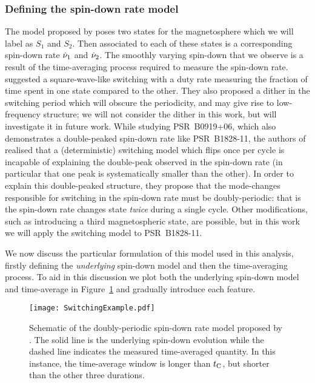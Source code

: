 \documentclass[../full_thesis/full_thesis.tex]{subfiles}
\begin{document}
\subsubsection{Defining the spin-down rate model}
\label{sec: spin-down rate}

The model proposed by \citet{Lyne2010} poses two states for the magnetosphere
which we will label as $S_{1}$ and $S_{2}$. Then associated to each of these
states is a corresponding spin-down rate $\dot{\nu}_{1}$ and $\dot{\nu}_{2}$. The
smoothly varying spin-down that we observe is a result of the time-averaging
process required to measure the spin-down rate. \citet{Lyne2010} suggested a
square-wave-like switching with a duty rate measuring the fraction of time
spent in one state compared to the other. They also proposed a dither in the
switching period which will obscure the periodicity, and may give rise to
low-frequency structure; we will not consider the dither in this work, but will
investigate it in future work. While studying PSR~B0919+06, which also
demonstrates a double-peaked spin-down rate like PSR~B1828-11, the authors of
\citet{Perera2015} realised that a (deterministic) switching model which flips
once per cycle is incapable of explaining the double-peak observed in the
spin-down rate (in particular that one peak is systematically smaller than the
other). In order to explain this double-peaked structure, they propose that the
mode-changes responsible for switching in the spin-down rate must be
doubly-periodic: that is the spin-down rate changes state \emph{twice} during a
single cycle. Other modifications, such as introducing a third magnetospheric
state, are possible, but in this work we will apply the \citet{Perera2015}
switching model to PSR~B1828-11.

We now discuss the particular formulation of this model used in this
analysis, firstly defining the \emph{underlying} spin-down model and then the
time-averaging process. To aid in this discussion we plot both the underlying
spin-down model and time-average in Figure~\ref{fig: perera illustration} and
gradually introduce each feature.
\begin{figure}[htb]
\centering \texttt{[image: SwitchingExample.pdf]}
\caption{Schematic of the doubly-periodic spin-down rate model proposed by
\citet{Perera2015}. The solid line is the underlying spin-down evolution while
the dashed line indicates the measured time-averaged quantity. In this
instance, the time-average window is longer than $t_{\mathrm{C}}$, but shorter than the
other three durations.}
\label{fig: perera illustration}
\end{figure}
\end{document}
